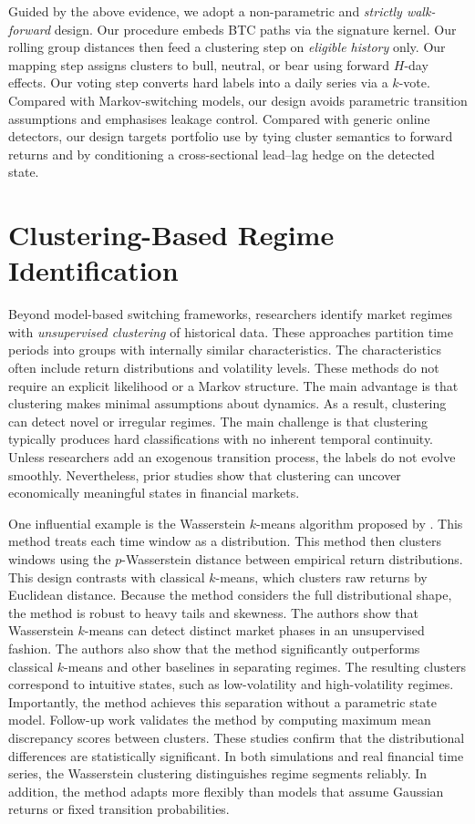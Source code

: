 Guided by the above evidence, we adopt a non-parametric and \emph{strictly walk-forward} design. Our procedure embeds BTC paths via the signature kernel. Our rolling group distances then feed a clustering step on \emph{eligible history} only. Our mapping step assigns clusters to bull, neutral, or bear using forward $H$-day effects. Our voting step converts hard labels into a daily series via a $k$-vote. Compared with Markov-switching models, our design avoids parametric transition assumptions and emphasises leakage control. Compared with generic online detectors, our design targets portfolio use by tying cluster semantics to forward returns and by conditioning a cross-sectional lead--lag hedge on the detected state.


\section{Clustering-Based Regime Identification}

Beyond model-based switching frameworks, researchers identify market regimes with \emph{unsupervised clustering} of historical data. These approaches partition time periods into groups with internally similar characteristics. The characteristics often include return distributions and volatility levels. These methods do not require an explicit likelihood or a Markov structure. The main advantage is that clustering makes minimal assumptions about dynamics. As a result, clustering can detect novel or irregular regimes. The main challenge is that clustering typically produces hard classifications with no inherent temporal continuity. Unless researchers add an exogenous transition process, the labels do not evolve smoothly. Nevertheless, prior studies show that clustering can uncover economically meaningful states in financial markets.

One influential example is the Wasserstein $k$-means algorithm proposed by \cite{Horvath_2021, Horvath2024JCF}. This method treats each time window as a distribution. This method then clusters windows using the $p$-Wasserstein distance between empirical return distributions. This design contrasts with classical $k$-means, which clusters raw returns by Euclidean distance. Because the method considers the full distributional shape, the method is robust to heavy tails and skewness. The authors show that Wasserstein $k$-means can detect distinct market phases in an unsupervised fashion. The authors also show that the method significantly outperforms classical $k$-means and other baselines in separating regimes. The resulting clusters correspond to intuitive states, such as low-volatility and high-volatility regimes. Importantly, the method achieves this separation without a parametric state model. Follow-up work validates the method by computing maximum mean discrepancy scores between clusters. These studies confirm that the distributional differences are statistically significant. In both simulations and real financial time series, the Wasserstein clustering distinguishes regime segments reliably. In addition, the method adapts more flexibly than models that assume Gaussian returns or fixed transition probabilities.

